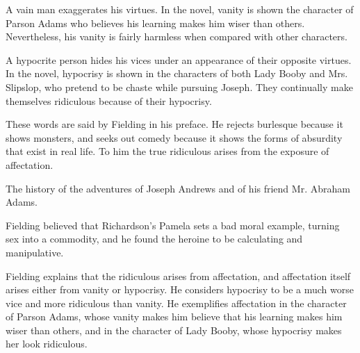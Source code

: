 \documentclass[12pt, a4paper]{article}
\begin{document}

\ind A vain man exaggerates his virtues. In the novel, vanity is shown the character of Parson Adams who
believes his learning makes him wiser than  others. Nevertheless, his vanity is fairly 
harmless when compared with other characters.


\restoregeometry


\ind A hypocrite person hides his vices under an appearance of their opposite virtues. 
In the novel, hypocrisy is shown in the characters of both
Lady Booby and Mrs. Slipslop, who pretend to be chaste while pursuing Joseph.
They continually make themselves ridiculous because of their hypocrisy.



These words are said by Fielding in his preface. He rejects burlesque because it shows monsters,
and seeks out comedy because it shows the forms of absurdity that exist in real life. 
To him the true ridiculous arises from the exposure of affectation.


The history of the adventures of Joseph Andrews and of his friend Mr. Abraham Adams.


Fielding believed that Richardson's Pamela sets a bad moral
example, turning sex into a commodity, and he found the heroine to be calculating and
manipulative.



Fielding explains that the ridiculous arises from affectation, and 
affectation itself arises either from vanity or hypocrisy.
He considers hypocrisy to be a much worse vice and more ridiculous than vanity.
He exemplifies affectation in the character of Parson Adams, whose vanity makes him 
believe that his learning makes him wiser than others, and in the character of Lady
Booby, whose hypocrisy makes her look ridiculous.

\end{document}

